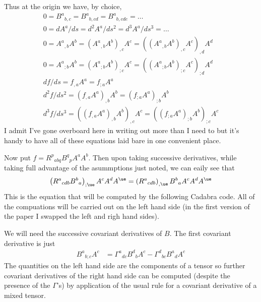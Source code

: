 \documentclass[12pt]{cdblatex}
\begin{document}
Thus at the origin we have, by choice,
\begin{gather*}
   0 = B^{a}{}_{b,c} = B^{a}{}_{b,cd} = B^{a}{}_{b,cde} = \dots\\[5pt]
   0 = dA^{a}/ds = d^2A^{a}/ds^2 = d^3A^{a}/ds^3 = \dots\\[5pt]
   0 = A^{a}{}_{,b} A^{b} = \left(A^{a}{}_{,b} A^{b}\right)_{,c} A^{c} = \left(\left(A^{a}{}_{,b} A^{b}\right)_{,c} A^{c}\right)_{,d} A^{d}\\[5pt]
   0 = A^{a}{}_{;b} A^{b} = \left(A^{a}{}_{;b} A^{b}\right)_{;c} A^{c} = \left(\left(A^{a}{}_{;b} A^{b}\right)_{;c} A^{c}\right)_{;d} A^{d}\\[5pt]
   df/ds = f_{,a} A^{a} = f_{;a} A^{a}\\[5pt]
   d^2f/ds^2 = \left ( f_{,a} A^{a} \right)_{,b} A^{b} = \left ( f_{;a} A^{a} \right)_{;b} A^{b}\\[5pt]
   d^3f/ds^3 = \left(\left ( f_{,a} A^{a} \right)_{,b} A^{b}\right)_{,c} A^{c} = \left(\left ( f_{;a} A^{a} \right)_{;b} A^{b}\right)_{;c} A^{c}
\end{gather*}
I admit I've gone overboard here in writing out more than I need to but it's handy to have all
of these equations laid bare in one convenient place.

Now put $f = R^{p}{}_{abq} B^{q}{}_{p} A^{a} A^{b}$. Then upon taking successive derivatives,
while taking full advantage of the asummptions just noted, we can eaily see that
\begin{align}
   \label{eqn:main}
   \left( R^{a}{}_{cdb} B^{b}{}_{a} \right)_{;\ue} A^{c} A^{d} A^{\ue}
   =
   \left( R^{a}{}_{cdb} \right)_{,\ue} B^{b}{}_{a} A^{c} A^{d} A^{\ue}
\end{align}
This is the equation that will be computed by the following Cadabra code. All of the
compuations will be carried out on the left hand side (in the first version of the paper I
swapped the left and righ hand sides).

We will need the successive covariant derivatives of $B$. The first covariant derivative is
just \begin{align*} B^{a}{}_{b;c} A^c &= \Gamma^{a}{}_{dc}B^{d}{}_{b} A^c -
\Gamma^{d}{}_{bc}B^{a}{}_{d} A^c \end{align*} The quantities on the left hand side are the
components of a tensor so further covariant derivatives of the right hand side can be computed
(despite the presence of the $\Gamma$'s) by application of the usual rule for a covariant
derivative of a mixed tensor.
\end{document}
